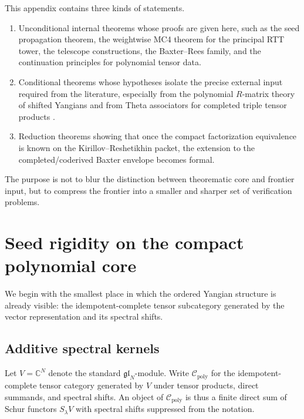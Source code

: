 \begin{remark}
\label{rem:typeA-status-scope}
This appendix contains three kinds of statements.
\begin{enumerate}
 \item Unconditional internal theorems whose proofs are given here,
 such as the seed propagation theorem, the weightwise MC4 theorem for
 the principal RTT tower, the telescope constructions, the
 Baxter--Rees family, and the continuation principles for polynomial
 tensor data.
 \item Conditional theorems whose hypotheses isolate the precise
 external input required from the literature, especially from the
 polynomial $R$-matrix theory of shifted Yangians and from Theta
 associators for completed triple tensor products
 \cite{HZ24,ZhangTheta24}.
 \item Reduction theorems showing that once the compact factorization
 equivalence is known on the Kirillov--Reshetikhin packet, the
 extension to the completed/coderived Baxter envelope becomes formal.
\end{enumerate}
The purpose is not to blur the distinction between theorematic core and
frontier input, but to compress the frontier into a smaller and sharper
set of verification problems.
\end{remark}

\section{Seed rigidity on the compact polynomial core}
\label{sec:typeA-seed-rigidity}

We begin with the smallest place in which the ordered Yangian structure
is already visible: the idempotent-complete tensor subcategory generated
by the vector representation and its spectral shifts.

\subsection{Additive spectral kernels}

Let $V=\mathbb C^N$ denote the standard $\mathfrak{gl}_N$-module. Write
$\mathcal C_{\mathrm{poly}}$ for the idempotent-complete tensor category
generated by $V$ under tensor products, direct summands, and spectral
shifts. An object of $\mathcal C_{\mathrm{poly}}$ is thus a finite direct
sum of Schur functors $S_\lambda V$ with spectral shifts suppressed from
the notation.

